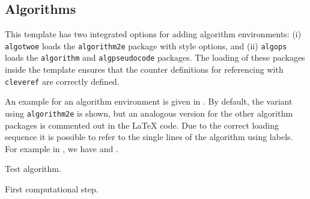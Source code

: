 \documentclass[%
  a4paper,
  twocolumn,
  algotwoe,
]{preprint}
\begin{document}

\subsection{Algorithms}%
\label{subsec:algorithms}

This template has two integrated options for adding algorithm environments:
(i) \texttt{algotwoe} loads the \texttt{algorithm2e} package with style
options, and (ii) \texttt{algops} loads the \texttt{algorithm} and
\texttt{algpseudocode} packages.
The loading of these packages inside the template ensures that the counter
definitions for referencing with \texttt{cleveref} are correctly defined.

An example for an algorithm environment is given in .
By default, the variant using \texttt{algorithm2e} is shown, but an analogous
version for the other algorithm packages is commented out in the
\LaTeX{} code.
Due to the correct loading sequence it is possible to refer to the single
lines of the algorithm using labels.
For example in , we have  and
.

\begin{algorithm}[t]
  \SetAlgoHangIndent{1pt}
  \DontPrintSemicolon
  \caption{Test algorithm.}
  \label{alg:test}
  
  
  First computational step.\;
  \label{alg:line1}
  
   \label{alg:line5}
\end{algorithm}
\end{document}
